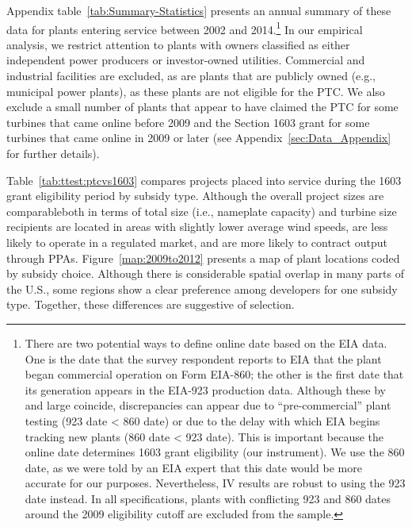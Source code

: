 \documentclass[12pt]{article}
\begin{document}
Appendix table~\ref{tab:Summary-Statistics} presents an annual summary of these data for plants entering service between 2002 and 2014.\footnote{There are two potential ways to define online date based on the EIA data. One is the date that the survey respondent reports to EIA that the plant began commercial operation on Form EIA-860; the other is the first date that its generation appears in the EIA-923 production data. Although these by and large coincide, discrepancies can appear due to ``pre-commercial'' plant testing (923 date \textless{} 860 date) or due to the delay with which EIA begins tracking new plants (860 date \textless{} 923 date). This is important because the online date determines 1603 grant eligibility (our instrument). We use the 860 date, as we were told by an EIA expert that this date would be more accurate for our purposes. Nevertheless, IV results are robust to using the 923 date instead. In all specifications, plants with conflicting 923 and 860 dates around the 2009 eligibility cutoff are excluded from the sample.} In our empirical analysis, we restrict attention to plants with owners classified as either independent power producers or investor-owned utilities. Commercial and industrial facilities are excluded, as are plants that are publicly owned (e.g., municipal power plants), as these plants are not eligible for the PTC. We also exclude a small number of plants that appear to have claimed the PTC for some turbines that came online before 2009 and the Section 1603 grant for some turbines that came online in 2009 or later (see Appendix~\ref{sec:Data_Appendix} for further details).

Table~\ref{tab:ttest:ptcvs1603} compares projects placed into service during the 1603 grant eligibility period by subsidy type. Although the overall project sizes are comparable\textemdash both in terms of total size (i.e., nameplate capacity) and turbine size recipients are located in areas with slightly lower average wind speeds, are less likely to operate in a regulated market, and are more likely to contract output through PPAs. Figure~\ref{map:2009to2012} presents a map of plant locations coded by subsidy choice. Although there is considerable spatial overlap in many parts of the U.S., some regions show a clear preference among developers for one subsidy type. Together, these differences are suggestive of selection.
\end{document}

